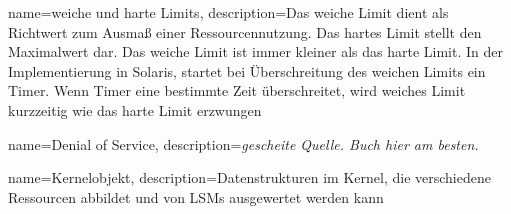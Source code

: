 {%
  name={weiche und harte Limits},
  description={Das weiche Limit dient als Richtwert zum Ausmaß einer Ressourcennutzung. Das hartes Limit stellt den Maximalwert dar. Das weiche Limit ist immer kleiner als das harte Limit. In der Implementierung in Solaris, startet bei Überschreitung des weichen Limits ein Timer. Wenn Timer eine bestimmte Zeit überschreitet, wird weiches Limit kurzzeitig wie das harte Limit erzwungen \cite{softHardLimits}}
}

{%
  name={Denial of Service},
  description={\emph{gescheite Quelle. Buch hier am besten.}}
}

{%
  name={Kernelobjekt},
  description={Datenstrukturen im Kernel, die verschiedene Ressourcen abbildet und von LSMs ausgewertet werden kann \cite{kernelObjects}}
}
